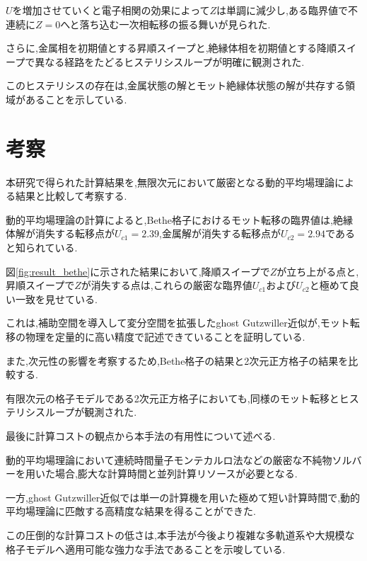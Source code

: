 $U$を増加させていくと電子相関の効果によって$Z$は単調に減少し,ある臨界値で不連続に$Z=0$へと落ち込む一次相転移の振る舞いが見られた.

さらに,金属相を初期値とする昇順スイープと,絶縁体相を初期値とする降順スイープで異なる経路をたどるヒステリシスループが明確に観測された.

このヒステリシスの存在は,金属状態の解とモット絶縁体状態の解が共存する領域があることを示している.

\section{考察}

本研究で得られた計算結果を,無限次元において厳密となる動的平均場理論による結果と比較して考察する.

動的平均場理論の計算によると,Bethe格子におけるモット転移の臨界値は,絶縁体解が消失する転移点が$U_{c1} = 2.39$,金属解が消失する転移点が$U_{c2} = 2.94$であると知られている.

図\ref{fig:result_bethe}に示された結果において,降順スイープで$Z$が立ち上がる点と,昇順スイープで$Z$が消失する点は,これらの厳密な臨界値$U_{c1}$および$U_{c2}$と極めて良い一致を見せている.

これは,補助空間を導入して変分空間を拡張したghost Gutzwiller近似が,モット転移の物理を定量的に高い精度で記述できていることを証明している.

また,次元性の影響を考察するため,Bethe格子の結果と2次元正方格子の結果を比較する.

有限次元の格子モデルである2次元正方格子においても,同様のモット転移とヒステリシスループが観測された.

最後に計算コストの観点から本手法の有用性について述べる.

動的平均場理論において連続時間量子モンテカルロ法などの厳密な不純物ソルバーを用いた場合,膨大な計算時間と並列計算リソースが必要となる.

一方,ghost Gutzwiller近似では単一の計算機を用いた極めて短い計算時間で,動的平均場理論に匹敵する高精度な結果を得ることができた.

この圧倒的な計算コストの低さは,本手法が今後より複雑な多軌道系や大規模な格子モデルへ適用可能な強力な手法であることを示唆している.